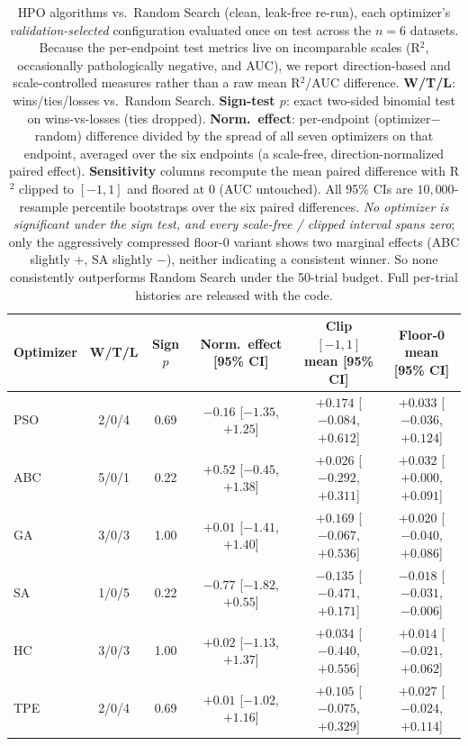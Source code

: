 \documentclass[journal,onecolumn]{IEEEtran}
\begin{document}
\begin{table}[!t]
\centering
\caption{HPO algorithms vs.\ Random Search (clean, leak-free re-run), each optimizer's \emph{validation-selected} configuration evaluated once on test across the $n=6$ datasets. Because the per-endpoint test metrics live on incomparable scales (R$^2$, occasionally pathologically negative, and AUC), we report direction-based and scale-controlled measures rather than a raw mean R$^2$/AUC difference. \textbf{W/T/L}: wins/ties/losses vs.\ Random Search. \textbf{Sign-test $p$}: exact two-sided binomial test on wins-vs-losses (ties dropped). \textbf{Norm.\ effect}: per-endpoint (optimizer$-$random) difference divided by the spread of all seven optimizers on that endpoint, averaged over the six endpoints (a scale-free, direction-normalized paired effect). \textbf{Sensitivity} columns recompute the mean paired difference with R$^2$ clipped to $[-1,1]$ and floored at $0$ (AUC untouched). All 95\% CIs are $10{,}000$-resample percentile bootstraps over the six paired differences. \emph{No optimizer is significant under the sign test, and every scale-free / clipped interval spans zero}; only the aggressively compressed floor-$0$ variant shows two marginal effects (ABC slightly $+$, SA slightly $-$), neither indicating a consistent winner. So none consistently outperforms Random Search under the 50-trial budget. Full per-trial histories are released with the code.}
\label{tab:best_results}
\small
\setlength{\tabcolsep}{4pt}
\begin{tabular}{lccccc}
\toprule
\textbf{Optimizer} & \textbf{W/T/L} & \textbf{Sign $p$} & \textbf{Norm.\ effect [95\% CI]} & \textbf{Clip $[-1,1]$ mean [95\% CI]} & \textbf{Floor-0 mean [95\% CI]} \\
\midrule
PSO & 2/0/4 & 0.69 & $-0.16$ [$-1.35$, $+1.25$] & $+0.174$ [$-0.084$, $+0.612$] & $+0.033$ [$-0.036$, $+0.124$] \\
ABC & 5/0/1 & 0.22 & $+0.52$ [$-0.45$, $+1.38$] & $+0.026$ [$-0.292$, $+0.311$] & $+0.032$ [$+0.000$, $+0.091$] \\
GA  & 3/0/3 & 1.00 & $+0.01$ [$-1.41$, $+1.40$] & $+0.169$ [$-0.067$, $+0.536$] & $+0.020$ [$-0.040$, $+0.086$] \\
SA  & 1/0/5 & 0.22 & $-0.77$ [$-1.82$, $+0.55$] & $-0.135$ [$-0.471$, $+0.171$] & $-0.018$ [$-0.031$, $-0.006$] \\
HC  & 3/0/3 & 1.00 & $+0.02$ [$-1.13$, $+1.37$] & $+0.034$ [$-0.440$, $+0.556$] & $+0.014$ [$-0.021$, $+0.062$] \\
TPE & 2/0/4 & 0.69 & $+0.01$ [$-1.02$, $+1.16$] & $+0.105$ [$-0.075$, $+0.329$] & $+0.027$ [$-0.024$, $+0.114$] \\
\bottomrule
\end{tabular}
\end{table}
\end{document}
